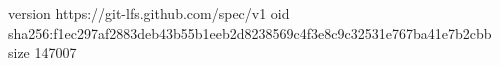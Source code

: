 version https://git-lfs.github.com/spec/v1
oid sha256:f1ec297af2883deb43b55b1eeb2d8238569c4f3e8c9c32531e767ba41e7b2cbb
size 147007
